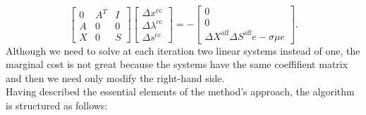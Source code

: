 \documentclass[a4paper,10 pt,titlepage,twoside]{book}
\theoremstyle{plain}
\theoremstyle{definition}
\theoremstyle{remark}
\begin{document}
\begin{equation}\label{(C)}
\begin{bmatrix}
0&A^{T}&I \\A&0&0\\X&0&S
\end{bmatrix}\begin{bmatrix}
\Delta x^{\text{cc}}\\\Delta\lambda^{\text{cc}} \\\Delta s^{\text{cc}}
\end{bmatrix}=-\begin{bmatrix}
0\\0\\\Delta X^{\text{aff}}\Delta S^{\text{aff}}e - \sigma\mu e
\end{bmatrix}.
\end{equation}
Although we need to solve at each iteration two linear systems instead of one, the marginal cost is not great because the systems have the same coeffifient matrix and then we need only modify the right-hand side. \\
 Having described the essential elements of the method's approach, the algorithm is structured as follows:
\end{document}
